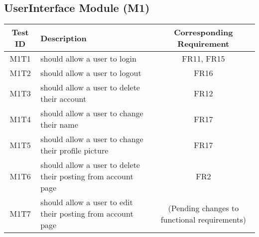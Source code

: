 \documentclass[fullpage]{article}
\begin{document}
\subsection{UserInterface Module (M1)}
\begin{table}[H]
\flushleft
\begin{tabular}{|c|p{8.5cm}|c|}
\hline
 \rowcolor{lightgray} 
\textbf{Test ID} &\textbf{Description} &\textbf{Corresponding Requirement}\\
\hline
M1T1 & should allow a user to login & FR11, FR15 \\
\hline
M1T2 & should allow a user to logout & FR16 \\
\hline
M1T3 & should allow a user to delete their account & FR12 \\
\hline
M1T4 & should allow a user to change their name & FR17 \\
\hline
M1T5 & should allow a user to change their profile picture & FR17 \\
\hline
M1T6 & should allow a user to delete their posting from account page & FR2 \\
\hline
M1T7 & should allow a user to edit their posting from account page & (Pending changes to functional requirements) \\
\hline
\end{tabular}
\end{table}
\end{document}
